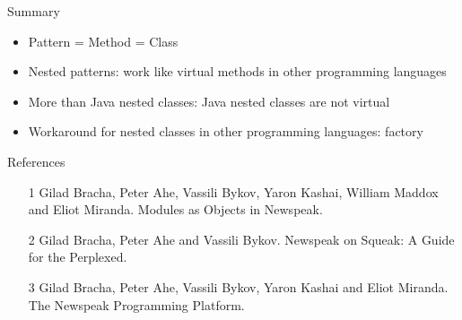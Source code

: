 \documentclass[xcolor=dvipsname,handout]{beamer} %
\begin{document}
\begin{frame}{Summary}
\begin{itemize}
  \item Pattern = Method = Class
  \item Nested patterns: work like virtual methods in other programming languages
  \item More than Java nested classes: Java nested classes are not virtual
  \item Workaround for nested classes in other programming languages: factory
\end{itemize}
\end{frame}

\begin{frame}{References}
\begin{itemize}
  \item [1] Gilad Bracha, Peter Ahe, Vassili Bykov, Yaron Kashai, William Maddox and Eliot Miranda. Modules as Objects in Newspeak.
  \item [2] Gilad Bracha, Peter Ahe and Vassili Bykov. Newspeak on Squeak: A Guide for the Perplexed.
  \item [3] Gilad Bracha, Peter Ahe, Vassili Bykov, Yaron Kashai and Eliot Miranda. The Newspeak Programming Platform. 
\end{itemize}
\end{frame}
\end{document}
